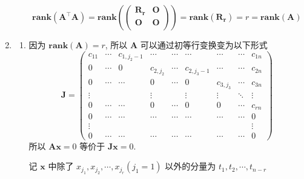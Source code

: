 \documentclass[11pt,letter,notitlepage]{article}
\newcommand{\rank}[1]{ \textbf{rank}  (#1)  }
\begin{document}
\begin{solution}
\begin{enumerate}
\begin{enumerate}
			            $$
				            \rank{\mathbf{A}^{\top}\mathbf{A}}
				            = \rank{
					            \begin{pmatrix}
						            \mathbf{R_r} & \mathbf{O} \\
						            \mathbf{O}   & \mathbf{O} \\
					            \end{pmatrix}}
				            = \rank{\mathbf{R_r}}
				            = r
				            = \rank{\mathbf{A}}
			            $$
		      \end{enumerate}
		\item \begin{enumerate}
			      \item 因为 $\rank{\mathbf{A}}=r$, 所以 $\mathbf{A}$ 可以通过初等行变换变为以下形式
			            $$\mathbf{J}=\begin{pmatrix}
					            c_{11} & \cdots & c_{1,j_2 -1} & \cdots    & \cdots & \cdots       & \cdots    & \cdots & c_{1n} \\
					            0      & \cdots & 0            & c_{2,j_2} & \cdots & c_{2,j_3 -1} & \cdots    & \cdots & c_{2n} \\
					            0      & \cdots & \cdots       & 0         & \cdots & 0            & c_{3,j_3} & \cdots & c_{3n} \\
					            \vdots &        &              & \vdots    &        & \vdots       & \vdots    & \ddots & \vdots \\
					            0      & \cdots & \cdots       & 0         & \cdots & 0            & 0         & \cdots & c_{rn} \\
					            0      & \cdots & \cdots       & \cdots    & \cdots & \cdots       & \cdots    & \cdots & 0      \\
					            \vdots &        &              &           &        &              &           &        & \vdots \\
					            0      & \cdots & \cdots       & \cdots    & \cdots & \cdots       & \cdots    & \cdots & 0
				            \end{pmatrix}$$
			            所以 $\mathbf{Ax}=0$ 等价于 $\mathbf{Jx}=0$.

			            记 $\mathbf{x}$ 中除了 $x_{j_1}, x_{j_2}, \cdots, x_{j_r} (j_1=1)$ 以外的分量为 $t_1, t_2, \cdots, t_{n-r}$


\end{enumerate}
\end{enumerate}
\end{solution}
\end{document}
